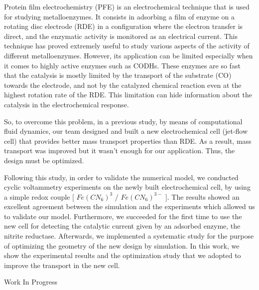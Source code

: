 {\normalsize
Protein film electrochemistry (PFE) is an electrochemical technique that is used for studying metalloenzymes. It consists in adsorbing a film of enzyme on a rotating disc electrode (RDE) in a configuration where the electron transfer is direct, and the enzymatic activity is monitored as an electrical current. This technique has proved extremely useful to study various aspects of the activity of different metalloenzymes. However, its application can be limited especially when it comes to highly active enzymes such as CODHs. These enzymes are so fast that the catalysis is mostly limited by the transport of the substrate (CO) towards the electrode, and not by the catalyzed chemical reaction even at the highest rotation rate of the RDE. This limitation can hide information about the catalysis in the electrochemical response.



So, to overcome this problem, in a previous study, by means of computational fluid dynamics, our team designed and built a new electrochemical cell (jet-flow cell) that provides better mass transport properties than RDE. As a result, mass transport was improved but it wasn't enough for our application. Thus, the design must be optimized.


Following this study, in order to validate the numerical model, we conducted cyclic voltammetry experiments on the newly built electrochemical cell, by using a simple redox couple [ $Fe(CN_6)^3$ / $Fe(CN_6)^{3-}$ ]. The results showed an excellent agreement between the simulation and the experiments which allowed us to validate our model. Furthermore, we succeeded for the first time to use the new cell for detecting the catalytic current given by an adsorbed enzyme, the nitrite reductase. Afterwards, we implemented a systematic study for the purpose of optimizing the geometry of the new design by simulation. In this work, we show the experimental results and the optimization study that we adopted to improve the transport in the new cell.

 \vfill Work In Progress

}
 
